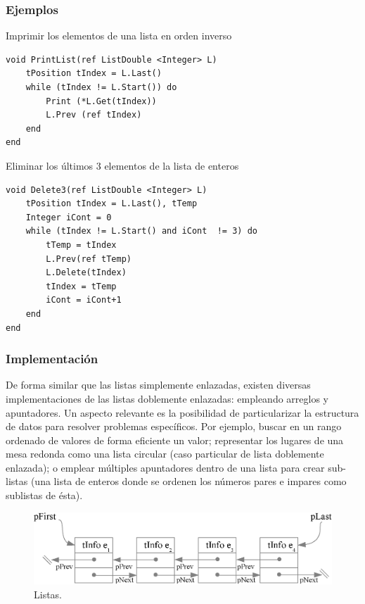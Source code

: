 \subsubsection{Ejemplos}

Imprimir los elementos de una lista en orden inverso 
\begin{lstlisting}[upquote=true, language=pseudo]
void PrintList(ref ListDouble <Integer> L) 
    tPosition tIndex = L.Last()
    while (tIndex != L.Start()) do
        Print (*L.Get(tIndex)) 
        L.Prev (ref tIndex) 
    end 
end
\end{lstlisting}

Eliminar los últimos 3 elementos de la lista de enteros
\begin{lstlisting}[upquote=true, language=pseudo]
void Delete3(ref ListDouble <Integer> L) 
    tPosition tIndex = L.Last(), tTemp
    Integer iCont = 0 
    while (tIndex != L.Start() and iCont  != 3) do
        tTemp = tIndex 
        L.Prev(ref tTemp)
        L.Delete(tIndex) 
        tIndex = tTemp 
        iCont = iCont+1
    end
end
\end{lstlisting}

\subsubsection{Implementación}

De forma similar que las listas simplemente enlazadas, existen diversas implementaciones de las listas doblemente enlazadas: empleando arreglos y apuntadores. Un aspecto relevante es la posibilidad de particularizar la estructura de datos para resolver problemas específicos. Por ejemplo, buscar en un rango ordenado de valores de forma eficiente un valor; representar los lugares de una mesa redonda como una lista circular (caso particular de lista doblemente enlazada); o emplear múltiples apuntadores dentro de una lista para crear sub-listas (una lista de enteros donde se ordenen los números pares e impares como sublistas de ésta).

\begin{figure}[!htb]
\centering
\includegraphics[scale=.7]{images/listas2.eps}
\caption{Listas.}
\label{fig:listas2}
\end{figure}

